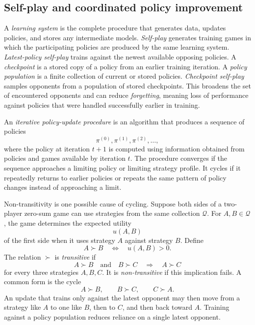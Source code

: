 \subsection{Self-play and coordinated policy improvement}
\label{app:self-play}

A \emph{learning system} is the complete procedure that generates data, updates policies, and stores any intermediate models. \emph{Self-play} generates training games in which the participating policies are produced by the same learning system. \emph{Latest-policy self-play} trains against the newest available opposing policies. A \emph{checkpoint} is a stored copy of a policy from an earlier training iteration. A \emph{policy population} is a finite collection of current or stored policies. \emph{Checkpoint self-play} samples opponents from a population of stored checkpoints. This broadens the set of encountered opponents and can reduce \emph{forgetting}, meaning loss of performance against policies that were handled successfully earlier in training.

An \emph{iterative policy-update procedure} is an algorithm that produces a sequence of policies
\[
    \pi^{(0)},\pi^{(1)},\pi^{(2)},\ldots,
\]
where the policy at iteration $t+1$ is computed using information obtained from policies and games available by iteration $t$. The procedure converges if the sequence approaches a limiting policy or limiting strategy profile. It cycles if it repeatedly returns to earlier policies or repeats the same pattern of policy changes instead of approaching a limit.

Non-transitivity is one possible cause of cycling. Suppose both sides of a two-player zero-sum game can use strategies from the same collection $\mathcal{Q}$. For $A,B\in\mathcal{Q}$, the game determines the expected utility
\[
    u(A,B)
\]
of the first side when it uses strategy $A$ against strategy $B$. Define
\[
    A\succ B
    \quad\Longleftrightarrow\quad
    u(A,B)>0.
\]
The relation $\succ$ is \emph{transitive} if
\[
    A\succ B
    \quad\text{and}\quad
    B\succ C
    \quad\Longrightarrow\quad
    A\succ C
\]
for every three strategies $A,B,C$. It is \emph{non-transitive} if this implication fails. A common form is the cycle
\[
    A\succ B,\qquad B\succ C,\qquad C\succ A.
\]
An update that trains only against the latest opponent may then move from a strategy like $A$ to one like $B$, then to $C$, and then back toward $A$. Training against a policy population reduces reliance on a single latest opponent.

